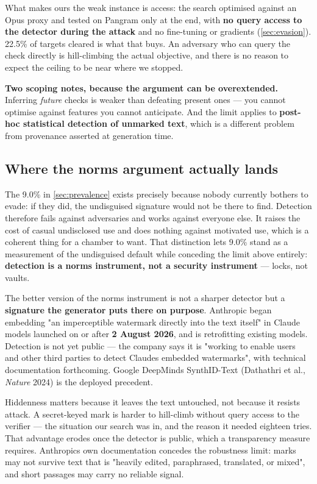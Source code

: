 What makes ours the weak instance is access: the search optimised against an
Opus proxy and tested on Pangram only at the end, with \textbf{no query access to
the detector during the attack} and no fine-tuning or gradients (\cref{sec:evasion}).
22.5\% of targets cleared is what that buys. An adversary who can query the
check directly is hill-climbing the actual objective, and there is no reason
to expect the ceiling to be near where we stopped.

\textbf{Two scoping notes, because the argument can be overextended.} Inferring
\emph{future} checks is weaker than defeating present ones --- you cannot optimise
against features you cannot anticipate. And the limit applies to \textbf{post-hoc
statistical detection of unmarked text}, which is a different problem from
provenance asserted at generation time.

\subsection{Where the norms argument actually lands}\label{sec:disc-norms}

The 9.0\% in \cref{sec:prevalence} exists precisely because nobody currently bothers to evade:
if they did, the undisguised signature would not be there to find. Detection
therefore fails against adversaries and works against everyone else. It raises
the cost of casual undisclosed use and does nothing against motivated use,
which is a coherent thing for a chamber to want. That distinction lets 9.0\%
stand as a measurement of the undisguised default while conceding the limit
above entirely: \textbf{detection is a norms instrument, not a security
instrument} --- locks, not vaults.

The better version of the norms instrument is not a sharper detector but a
\textbf{signature the generator puts there on purpose}. Anthropic began embedding
"an imperceptible watermark directly into the text itself" in Claude models
launched on or after \textbf{2 August 2026}, and is retrofitting existing models.
Detection is not yet public --- the company says it is
"working to enable users and other third parties to detect Claude\textquotesingle s embedded
watermarks", with technical documentation forthcoming. Google DeepMind\textquotesingle s
SynthID-Text (Dathathri et al., \emph{Nature} 2024) is the deployed precedent.

Hiddenness matters because it leaves the text untouched, not because it
resists attack. A secret-keyed mark is harder to hill-climb without query
access to the verifier --- the situation our search was in, and the reason it
needed eighteen tries. That advantage erodes once the detector is public,
which a transparency measure requires. Anthropic\textquotesingle s own documentation concedes
the robustness limit: marks may not survive text that is "heavily edited,
paraphrased, translated, or mixed", and short passages may carry no reliable
signal.

